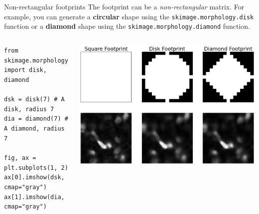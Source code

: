 \documentclass[9pt, aspectratio=169]{beamer}
\begin{document}
\begin{frame}
    {Non-rectangular footprints}
    The footprint can be a \textit{non-rectangular} matrix. For example, you can generate a \textbf{circular} shape using the \texttt{skimage.morphology.disk} function or a \textbf{diamond} shape using the \texttt{skimage.morphology.diamond} function.\\

    \vspace{2em}

    \begin{columns}
        \begin{column}{.5\textwidth}
            \begin{codebox}
                \texttt{from skimage.morphology import disk, diamond\\
                    \\
                    dsk = disk(7) \# A disk, radius 7\\
                    dia = diamond(7) \# A diamond, radius 7\\
                    \\
                    fig, ax = plt.subplots(1, 2)\\
                    ax[0].imshow(dsk, cmap="gray")\\
                    ax[1].imshow(dia, cmap="gray")
                }
            \end{codebox}
        \end{column}
        \begin{column}{.5\textwidth}
            \centering
            \includegraphics[width=\textwidth]{different_shaped_footprints.png}
        \end{column}
    \end{columns}
\end{frame}
\end{document}
